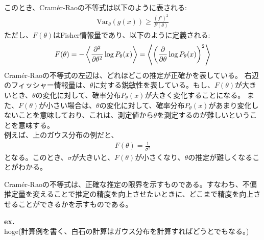 \documentclass[a4paper,11pt]{jsarticle}
\numberwithin{equation}{section}
\begin{document}
このとき、Cram\'er-Raoの不等式は以下のように表される:
\begin{align}
    \text{Var}_{\theta}(g(x)) \geq \frac{(f')^2}{F(\theta)}
\end{align}
ただし、$F(\theta)$はFisher情報量であり、以下のように定義される:
\begin{align}
    F(\theta) = -\ev{\pdv[2]{\theta} \log P_{\theta}(x)} =\ev{\qty(\pdv{\theta} \log P_{\theta}(x))^2}
\end{align}
Cram\'er-Raoの不等式の左辺は、どれほどこの推定が正確かを表している。
右辺のフィッシャー情報量は、$\theta$に対する鋭敏性を表している。もし、$F(\theta)$が大きいとき、$\theta$の変化に対して、確率分布$P_{\theta}(x)$が大きく変化することになる。
また、$F(\theta)$が小さい場合は、$\theta$の変化に対して、確率分布$P_{\theta}(x)$があまり変化しないことを意味しており、これは、測定値から$\theta$を測定するのが難しいということを意味する。\\
例えば、上のガウス分布の例だと、
\begin{align}
    F(\theta) = \frac{1}{\sigma^2}
\end{align}
となる。このとき、$\sigma$が大きいと、$F(\theta)$が小さくなり、$\theta$の推定が難しくなることがわかる。

Cram\'er-Raoの不等式は、正確な推定の限界を示すものである。すなわち、不偏推定量を変えることで推定の精度を向上させたいときに、どこまで精度を向上させることができるかを示すものである。

\textbf{ex.}\\
hoge(計算例を書く、白石の計算はガウス分布を計算すればどうとでもなる。)
\end{document}
